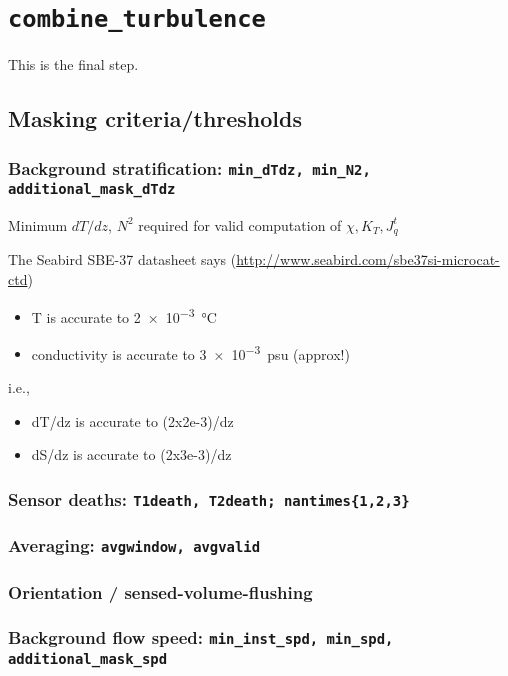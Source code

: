 \chapter{\texttt{combine\_turbulence}}

This is the final step.

\section{Masking criteria/thresholds}
\label{sec:orgccff08d}
\subsection{Background stratification: \texttt{min\_dTdz, min\_N2, additional\_mask\_dTdz}}

Minimum $dT/dz$, $N^2$ required for valid computation of $\chi, K_T, J_q^t$

The Seabird SBE-37 datasheet says (\url{http://www.seabird.com/sbe37si-microcat-ctd})
\begin{itemize}
\item T is accurate to \SI{2e-3}{\celsius}
\item conductivity is accurate to \SI{3e-3}{psu} (approx!)
\end{itemize}

i.e.,
\begin{itemize}
\item dT/dz is accurate to (2x2e-3)/dz
\item dS/dz is accurate to (2x3e-3)/dz
\end{itemize}

\subsection{Sensor deaths: \texttt{T1death, T2death; nantimes\{1,2,3\}}}

\subsection{Averaging: \texttt{avgwindow, avgvalid}}

\subsection{Orientation / sensed-volume-flushing}
\subsection{Background flow speed: \texttt{min\_inst\_spd, min\_spd, additional\_mask\_spd}}


